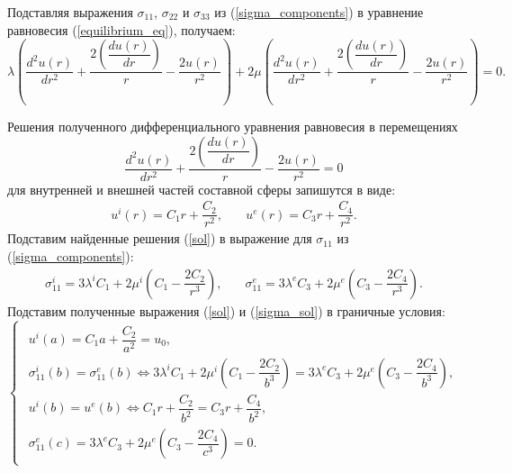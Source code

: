 \documentclass[a4paper,12pt]{article}	%
\let\DS     = \displaystyle
\begin{document}
Подставляя выражения $\sigma_{11}$, $\sigma_{22}$ и $\sigma_{33}$ из (\ref{sigma_components}) в уравнение равновесия (\ref{equilibrium_eq}), получаем:
\begin{equation}
    \DS \lambda\left(\frac{d^2u(r)}{dr^2}+\dfrac{2\left(\dfrac{d u(r)}{dr}\right)}{r}-\dfrac{2u(r)}{r^2}\right)+2\mu\left(\frac{d^2u(r)}{dr^2}+\dfrac{2\left(\dfrac{d u(r)}{dr}\right)}{r}-\dfrac{2u(r)}{r^2}\right)=0.
\end{equation}

Решения полученного дифференциального уравнения равновесия в перемещениях
\begin{equation}
    \DS\frac{d^2u(r)}{dr^2}+\dfrac{2\left(\dfrac{d u(r)}{dr}\right)}{r}-\dfrac{2u(r)}{r^2}=0
\end{equation}
для внутренней и внешней частей составной сферы запишутся в виде:
\begin{equation}\label{sol}
    \begin{array}{ll}
        \DS u^{i}(r)=C_1r+\dfrac{C_2}{r^2}, &\quad u^{e}(r)=C_3r+\dfrac{C_4}{r^2}.
    \end{array}
\end{equation}
Подставим найденные решения (\ref{sol}) в выражение для $\sigma_{11}$ из (\ref{sigma_components}):
\begin{equation}\label{sigma_sol}
    \begin{array}{ll}
        \DS \sigma_{11}^{i}=3\lambda^{i} C_1+2\mu^{i}\left(C_1-\dfrac{2C_2}{r^3}\right), &\quad \sigma_{11}^{e}=3\lambda^{e} C_3+2\mu^{e}\left(C_3-\dfrac{2C_4}{r^3}\right).
    \end{array}
\end{equation}
Подставим полученные выражения (\ref{sol}) и (\ref{sigma_sol}) в граничные условия:
\begin{equation}
\begin{cases}
    \begin{array}{l}
        \DS u^{i}(a)=C_1a+\dfrac{C_2}{a^2}=u_0,
        \\[3mm]
        \DS \sigma_{11}^{i}(b)=\sigma_{11}^{e}(b)\Leftrightarrow 3\lambda^{i} C_1+2\mu^{i}\left(C_1-\dfrac{2C_2}{b^3}\right)=3\lambda^{e} C_3+2\mu^{e}\left(C_3-\dfrac{2C_4}{b^3}\right),
        \\[3mm]
        \DS u^{i}(b)=u^{e}(b)\Leftrightarrow C_1r+\dfrac{C_2}{b^2}=C_3r+\dfrac{C_4}{b^2},
        \\[3mm]
        \DS \sigma_{11}^{e}(c)=3\lambda^{e} C_3+2\mu^{e}\left(C_3-\dfrac{2C_4}{c^3}\right)=0.
    \end{array}
\end{cases}
\end{equation}
\end{document}
